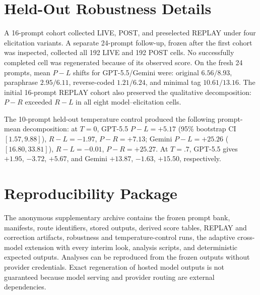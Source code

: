 \section{Held-Out Robustness Details}
A 16-prompt cohort collected LIVE, POST, and preselected REPLAY under four elicitation variants. A separate 24-prompt follow-up, frozen after the first cohort was inspected, collected all 192 LIVE and 192 POST cells. No successfully completed cell was regenerated because of its observed score. On the fresh 24 prompts, mean $P-L$ shifts for GPT-5.5/Gemini were: original $6.56/8.93$, paraphrase $2.95/6.11$, reverse-coded $1.21/6.24$, and minimal tag $10.61/13.16$. The initial 16-prompt REPLAY cohort also preserved the qualitative decomposition: $P-R$ exceeded $R-L$ in all eight model--elicitation cells.

The 10-prompt held-out temperature control produced the following prompt-mean decomposition: at $T=0$, GPT-5.5 $P-L=+5.17$ (95\% bootstrap CI $[1.57,9.88]$), $R-L=-1.97$, $P-R=+7.13$; Gemini $P-L=+25.26$ ($[16.80,33.81]$), $R-L=-0.01$, $P-R=+25.27$. At $T=.7$, GPT-5.5 gives $+1.95$, $-3.72$, $+5.67$, and Gemini $+13.87$, $-1.63$, $+15.50$, respectively.

\section{Reproducibility Package}
The anonymous supplementary archive contains the frozen prompt bank, manifests, route identifiers, stored outputs, derived score tables, REPLAY and correction artifacts, robustness and temperature-control runs, the adaptive cross-model extension with every interim look, analysis scripts, and deterministic expected outputs. Analyses can be reproduced from the frozen outputs without provider credentials. Exact regeneration of hosted model outputs is not guaranteed because model serving and provider routing are external dependencies.
